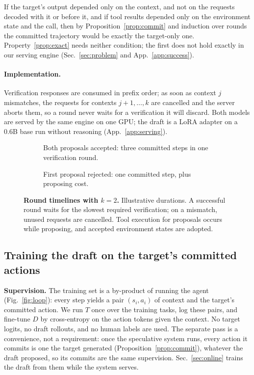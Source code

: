 If the target's output depended only on the context, and not on the requests decoded with it or before
it, and if tool results depended only on the environment state and the call, then by
Proposition~\ref{prop:commit} and induction over rounds the committed trajectory would be exactly the
target-only one. Property~\ref{prop:exact} needs neither condition; the first does not hold exactly in our
serving engine (Sec.~\ref{sec:problem} and App.~\ref{app:success}).

\paragraph{Implementation.}
Verification responses are consumed in prefix order; as soon as context $j$ mismatches, the requests for
contexts $j{+}1,\dots,k$ are cancelled and the server aborts them, so a round never waits for a
verification it will discard. Both models are served by the same engine on one GPU; the draft is a LoRA
adapter on a 0.6B base run without reasoning (App.~\ref{app:serving}).


\begin{figure}[tbp]
\centering\setlength{\fboxsep}{2pt}
\renewcommand{\looptagnode}[1]{}\renewcommand{\looptagA}[1]{}
\resizebox{0.9\linewidth}{!}{}\par\smallskip
\begin{subfigure}{\linewidth}\centering
\resizebox{\linewidth}{!}{}
\caption{Both proposals accepted: three committed steps in one verification round.}
\end{subfigure}\par\smallskip
\begin{subfigure}{\linewidth}\centering
\resizebox{\linewidth}{!}{}
\caption{First proposal rejected: one committed step, plus proposing cost.}
\end{subfigure}
\caption{\textbf{Round timelines with $k=2$.} Illustrative durations. A successful round waits for the
slowest required verification; on a mismatch, unused requests are cancelled. Tool execution for
proposals occurs while proposing, and accepted environment states are adopted.}
\label{fig:timelines}
\end{figure}


\subsection{Training the draft on the target's committed actions}
\label{app:detail:train}
\textbf{Supervision.} The training set is a by-product of running the agent (Fig.~\ref{fig:loop}): every step yields a pair
$(s_i, a_i)$ of context and the target's committed action. We run $T$ once over the training tasks, log
these pairs, and fine-tune $D$ by cross-entropy on the action tokens given the context. No target logits,
no draft rollouts, and no human labels are used. The separate pass is a convenience, not a requirement:
once the speculative system runs, every action it commits is one the target generated
(Proposition~\ref{prop:commit}), whatever the draft proposed, so its commits are the same supervision.
Sec.~\ref{sec:online} trains the draft from them while the system serves.

